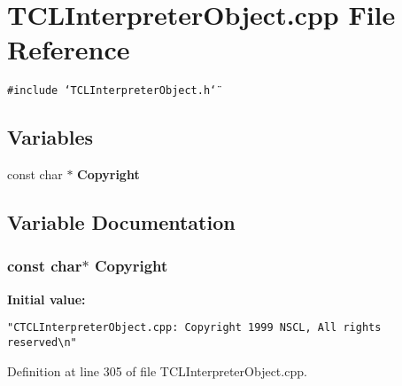 \section{TCLInterpreter\-Object.cpp File Reference}
\label{TCLInterpreterObject_8cpp}
{\tt \#include \char`\"{}TCLInterpreter\-Object.h\char`\"{}}\par
\subsection*{Variables}
\begin{CompactItemize}
\item 
const char $\ast$ {\bf Copyright}
\end{CompactItemize}


\subsection{Variable Documentation}
\subsubsection{\setlength{\rightskip}{0pt plus 5cm}const char$\ast$ Copyright\hspace{0.3cm}{\tt  [static]}}\label{TCLInterpreterObject_8cpp_a0}


{\bf Initial value:}

\footnotesize\begin{verbatim} 
"CTCLInterpreterObject.cpp: Copyright 1999 NSCL, All rights reserved\n"\end{verbatim}\normalsize 


Definition at line 305 of file TCLInterpreter\-Object.cpp.